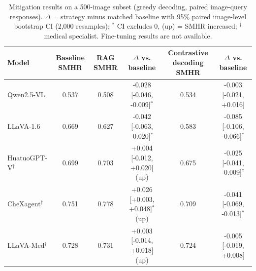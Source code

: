 \begin{table}[t]
\centering
\footnotesize
\begin{tabular}{lccccc}
\toprule
Model & Baseline SMHR & RAG SMHR & $\Delta$ vs. baseline & Contrastive decoding SMHR & $\Delta$ vs. baseline \\
\midrule
Qwen2.5-VL & 0.537 & 0.508 & -0.028 [-0.046, -0.009]$^{*}$ & 0.534 & -0.003 [-0.021, +0.016] \\
LLaVA-1.6 & 0.669 & 0.627 & -0.042 [-0.063, -0.020]$^{*}$ & 0.583 & -0.085 [-0.106, -0.066]$^{*}$ \\
HuatuoGPT-V$^{\dagger}$ & 0.699 & 0.703 & +0.004 [-0.012, +0.020] (up) & 0.675 & -0.025 [-0.041, -0.009]$^{*}$ \\
CheXagent$^{\dagger}$ & 0.751 & 0.778 & +0.026 [+0.003, +0.048]$^{*}$ (up) & 0.709 & -0.041 [-0.069, -0.013]$^{*}$ \\
LLaVA-Med$^{\dagger}$ & 0.728 & 0.731 & +0.003 [-0.014, +0.018] (up) & 0.724 & -0.005 [-0.019, +0.008] \\
\bottomrule
\end{tabular}
\caption{Mitigation results on a 500-image subset (greedy decoding, paired image-query responses). $\Delta$ = strategy minus matched baseline with 95\% paired image-level bootstrap CI (2,000 resamples); $^{*}$ CI excludes 0, (up) = SMHR increased; $^{\dagger}$ medical specialist. Fine-tuning results are not available.}
\label{tab:mitigation}
\end{table}
